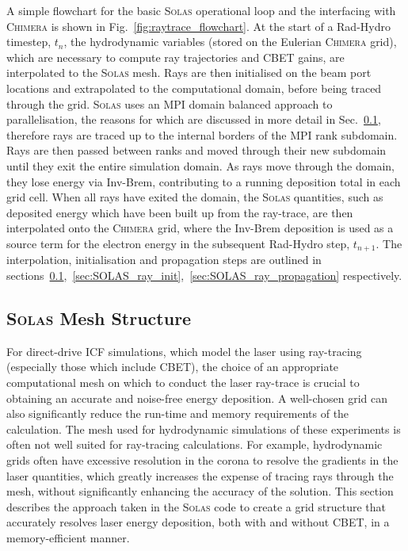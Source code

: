 A simple flowchart for the basic \textsc{Solas} operational loop and the interfacing with \textsc{Chimera} is shown in Fig.~\ref{fig:raytrace_flowchart}.
At the start of a \ac{Rad-Hydro} timestep, $t_n$, the hydrodynamic variables (stored on the Eulerian \textsc{Chimera} grid), which are necessary to compute ray trajectories and \ac{CBET} gains, are interpolated to the \textsc{Solas} mesh.
Rays are then initialised on the beam port locations and extrapolated to the computational domain, before being traced through the grid.
\textsc{Solas} uses an \ac{MPI} domain balanced approach to parallelisation, the reasons for which are discussed in more detail in Sec.~\ref{sec:SOLAS_mesh}, therefore rays are traced up to the internal borders of the \ac{MPI} rank subdomain.
Rays are then passed between ranks and moved through their new subdomain until they exit the entire simulation domain.
As rays move through the domain, they lose energy via \ac{Inv-Brem}, contributing to a running deposition total in each grid cell.
When all rays have exited the domain, the \textsc{Solas} quantities, such as deposited energy which have been built up from the ray-trace, are then interpolated onto the \textsc{Chimera} grid, where the \ac{Inv-Brem} deposition is used as a source term for the electron energy in the subsequent \ac{Rad-Hydro} step, $t_{n+1}$.
The interpolation, initialisation and propagation steps are outlined in sections~\ref{sec:SOLAS_mesh},~\ref{sec:SOLAS_ray_init},~\ref{sec:SOLAS_ray_propagation} respectively.


\subsection{\textsc{Solas} Mesh Structure}%
\label{sec:SOLAS_mesh}

For direct-drive \ac{ICF} simulations, which model the laser using ray-tracing (especially those which include \ac{CBET}), the choice of an appropriate computational mesh on which to conduct the laser ray-trace is crucial to obtaining an accurate and noise-free energy deposition.
A well-chosen grid can also significantly reduce the run-time and memory requirements of the calculation.
The mesh used for hydrodynamic simulations of these experiments is often not well suited for ray-tracing calculations.
For example, hydrodynamic grids often have excessive resolution in the corona to resolve the gradients in the laser quantities, which greatly increases the expense of tracing rays through the mesh, without significantly enhancing the accuracy of the solution.
This section describes the approach taken in the \textsc{Solas} code to create a grid structure that accurately resolves laser energy deposition, both with and without \ac{CBET}, in a memory-efficient manner.

